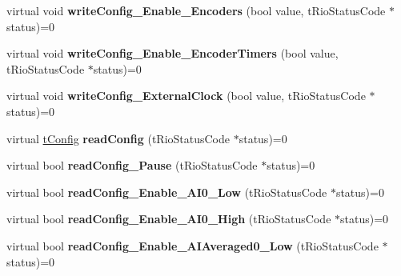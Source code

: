 \begin{DoxyCompactItemize}
\item 
\hypertarget{classnFPGA_1_1nFRC__2012__1__6__4_1_1tDMA_a6a79772c17bc891abf41e9a6c7accd37}{
virtual void {\bfseries writeConfig\_\-Enable\_\-Encoders} (bool value, tRioStatusCode $\ast$status)=0}
\label{classnFPGA_1_1nFRC__2012__1__6__4_1_1tDMA_a6a79772c17bc891abf41e9a6c7accd37}

\item 
\hypertarget{classnFPGA_1_1nFRC__2012__1__6__4_1_1tDMA_a3d73c3ae24b4a61ab40a8f7b7d4ec210}{
virtual void {\bfseries writeConfig\_\-Enable\_\-EncoderTimers} (bool value, tRioStatusCode $\ast$status)=0}
\label{classnFPGA_1_1nFRC__2012__1__6__4_1_1tDMA_a3d73c3ae24b4a61ab40a8f7b7d4ec210}

\item 
\hypertarget{classnFPGA_1_1nFRC__2012__1__6__4_1_1tDMA_a28171529b377f4e24117bafc57088912}{
virtual void {\bfseries writeConfig\_\-ExternalClock} (bool value, tRioStatusCode $\ast$status)=0}
\label{classnFPGA_1_1nFRC__2012__1__6__4_1_1tDMA_a28171529b377f4e24117bafc57088912}

\item 
\hypertarget{classnFPGA_1_1nFRC__2012__1__6__4_1_1tDMA_a24173ffd73f464a293e1c5844e805fab}{
virtual \hyperlink{unionnFPGA_1_1nFRC__2012__1__6__4_1_1tDMA_1_1tConfig}{tConfig} {\bfseries readConfig} (tRioStatusCode $\ast$status)=0}
\label{classnFPGA_1_1nFRC__2012__1__6__4_1_1tDMA_a24173ffd73f464a293e1c5844e805fab}

\item 
\hypertarget{classnFPGA_1_1nFRC__2012__1__6__4_1_1tDMA_a175749ef96deb9ae0cb4269bb97ff220}{
virtual bool {\bfseries readConfig\_\-Pause} (tRioStatusCode $\ast$status)=0}
\label{classnFPGA_1_1nFRC__2012__1__6__4_1_1tDMA_a175749ef96deb9ae0cb4269bb97ff220}

\item 
\hypertarget{classnFPGA_1_1nFRC__2012__1__6__4_1_1tDMA_a1581db7111b1cfeb24692e62e6c31876}{
virtual bool {\bfseries readConfig\_\-Enable\_\-AI0\_\-Low} (tRioStatusCode $\ast$status)=0}
\label{classnFPGA_1_1nFRC__2012__1__6__4_1_1tDMA_a1581db7111b1cfeb24692e62e6c31876}

\item 
\hypertarget{classnFPGA_1_1nFRC__2012__1__6__4_1_1tDMA_a825f900f98c5a6ab2d271062a4a1027a}{
virtual bool {\bfseries readConfig\_\-Enable\_\-AI0\_\-High} (tRioStatusCode $\ast$status)=0}
\label{classnFPGA_1_1nFRC__2012__1__6__4_1_1tDMA_a825f900f98c5a6ab2d271062a4a1027a}

\item 
\hypertarget{classnFPGA_1_1nFRC__2012__1__6__4_1_1tDMA_a7ec882c8619dacab5866d454c48daed4}{
virtual bool {\bfseries readConfig\_\-Enable\_\-AIAveraged0\_\-Low} (tRioStatusCode $\ast$status)=0}
\label{classnFPGA_1_1nFRC__2012__1__6__4_1_1tDMA_a7ec882c8619dacab5866d454c48daed4}


\end{DoxyCompactItemize}
